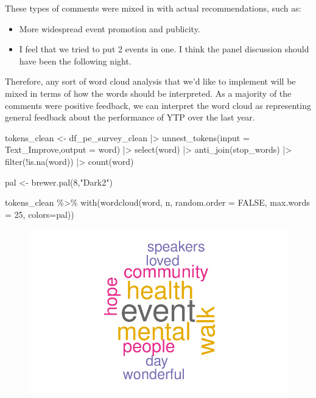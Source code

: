 \documentclass[
  letterpaper,
  DIV=11,
  numbers=noendperiod]{scrartcl}
\newenvironment{Shaded}{\begin{snugshade}}{\end{snugshade}}
\newcommand{\AttributeTok}[1]{\textcolor[rgb]{0.40,0.45,0.13}{#1}}
\newcommand{\ConstantTok}[1]{\textcolor[rgb]{0.56,0.35,0.01}{#1}}
\newcommand{\DecValTok}[1]{\textcolor[rgb]{0.68,0.00,0.00}{#1}}
\newcommand{\FunctionTok}[1]{\textcolor[rgb]{0.28,0.35,0.67}{#1}}
\newcommand{\NormalTok}[1]{\textcolor[rgb]{0.00,0.23,0.31}{#1}}
\newcommand{\OtherTok}[1]{\textcolor[rgb]{0.00,0.23,0.31}{#1}}
\newcommand{\SpecialCharTok}[1]{\textcolor[rgb]{0.37,0.37,0.37}{#1}}
\newcommand{\StringTok}[1]{\textcolor[rgb]{0.13,0.47,0.30}{#1}}
\begin{document}
These types of comments were mixed in with actual recommendations, such
as:

\begin{itemize}
\item
  More widespread event promotion and publicity.
\item
  I feel that we tried to put 2 events in one. I think the panel
  discussion should have been the following night.
\end{itemize}

Therefore, any sort of word cloud analysis that we'd like to implement
will be mixed in terms of how the words should be interpreted. As a
majority of the comments were positive feedback, we can interpret the
word cloud as representing general feedback about the performance of YTP
over the last year.

\begin{Shaded}
\begin{Highlighting}[]
\NormalTok{tokens\_clean }\OtherTok{\textless{}{-}}
\NormalTok{df\_pe\_survey\_clean }\SpecialCharTok{|\textgreater{}} 
  \FunctionTok{unnest\_tokens}\NormalTok{(}\AttributeTok{input =}\NormalTok{ Text\_Improve,}\AttributeTok{output =} \StringTok{\textquotesingle{}word\textquotesingle{}}\NormalTok{) }\SpecialCharTok{|\textgreater{}} 
  \FunctionTok{select}\NormalTok{(word) }\SpecialCharTok{|\textgreater{}} 
  \FunctionTok{anti\_join}\NormalTok{(stop\_words) }\SpecialCharTok{|\textgreater{}} 
  \FunctionTok{filter}\NormalTok{(}\SpecialCharTok{!}\FunctionTok{is.na}\NormalTok{(word)) }\SpecialCharTok{|\textgreater{}} 
  \FunctionTok{count}\NormalTok{(word)}

\NormalTok{pal }\OtherTok{\textless{}{-}} \FunctionTok{brewer.pal}\NormalTok{(}\DecValTok{8}\NormalTok{,}\StringTok{"Dark2"}\NormalTok{)}

\NormalTok{tokens\_clean }\SpecialCharTok{\%\textgreater{}\%} 
  \FunctionTok{with}\NormalTok{(}\FunctionTok{wordcloud}\NormalTok{(word, n, }\AttributeTok{random.order =} \ConstantTok{FALSE}\NormalTok{, }\AttributeTok{max.words =} \DecValTok{25}\NormalTok{, }\AttributeTok{colors=}\NormalTok{pal))}
\end{Highlighting}
\end{Shaded}

\begin{figure}[H]

{\centering \includegraphics{ytp_post_event_survey_files/figure-pdf/unnamed-chunk-22-1.pdf}

}

\end{figure}
\end{document}
